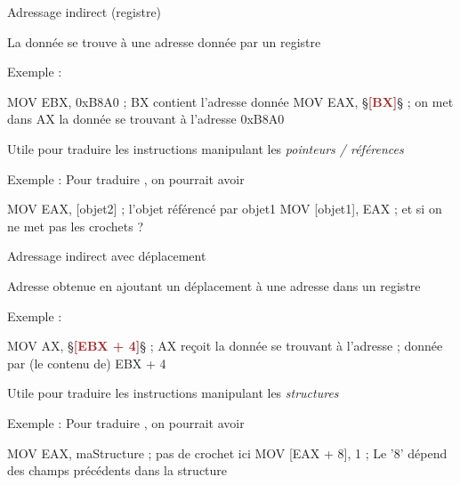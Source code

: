 \documentclass[14pt]{beamer}
\begin{document}
\begin{frame}[fragile]{Adressage indirect (registre)}

La donnée se trouve à une adresse donnée par un registre

\bigskip
Exemple :
\begin{Asm}
	MOV EBX, 0xB8A0 ; BX contient l'adresse donnée
	MOV EAX, §\textcolor{brown}{\textbf{[BX]}}§   ; on met dans AX la donnée se trouvant à l'adresse 0xB8A0
\end{Asm}

\bigskip
Utile pour traduire les instructions manipulant les \emph{pointeurs / références}

\bigskip
Exemple : Pour traduire , on pourrait avoir
\begin{Asm}
	MOV EAX, [objet2]      ; l'objet référencé par objet1
	MOV [objet1], EAX      ; et si on ne met pas les crochets ?
\end{Asm}
\end{frame}

\begin{frame}[fragile]{Adressage indirect avec déplacement}

Adresse obtenue en ajoutant un déplacement à une adresse dans un registre

\bigskip
Exemple :
\begin{Asm}
	MOV AX, §\textcolor{brown}{\textbf{[EBX + 4]}}§    ; AX reçoit la donnée se trouvant à l'adresse
	                      ; donnée par (le contenu de) EBX + 4
\end{Asm}

\bigskip
Utile pour traduire les instructions manipulant les \emph{structures}

\bigskip
Exemple : Pour traduire , on pourrait avoir
\begin{Asm}
	MOV EAX, maStructure  ; pas de crochet ici 
	MOV [EAX + 8], 1  ; Le '8' dépend des champs précédents dans la structure 
\end{Asm}
\end{frame}
\end{document}
